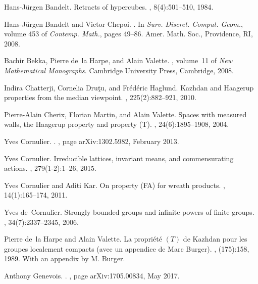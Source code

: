 \documentclass[a4paper]{article}
\theoremstyle{definition}
\begin{document}
\begin{thebibliography}{10}

Hans-J{\"{u}}rgen Bandelt.
\newblock Retracts of hypercubes.
, 8(4):501--510, 1984.

Hans-J{\"{u}}rgen Bandelt and Victor Chepoi.
.
\newblock In {\em Surv. Discret. Comput. Geom.}, volume 453 of {\em Contemp.
  Math.}, pages 49--86. Amer. Math. Soc., Providence, RI, 2008.

Bachir Bekka, Pierre de~la Harpe, and Alain Valette.
, volume~11 of {\em New Mathematical
  Monographs}.
\newblock Cambridge University Press, Cambridge, 2008.

Indira Chatterji, Cornelia Dru\c{t}u, and Fr\'{e}d\'{e}ric Haglund.
\newblock Kazhdan and {H}aagerup properties from the median viewpoint.
, 225(2):882--921, 2010.

Pierre-Alain Cherix, Florian Martin, and Alain Valette.
\newblock Spaces with measured walls, the {H}aagerup property and property
  ({T}).
, 24(6):1895--1908, 2004.

Yves {Cornulier}.
.
, page arXiv:1302.5982, February 2013.

Yves Cornulier.
\newblock Irreducible lattices, invariant means, and commensurating actions.
, 279(1-2):1--26, 2015.

Yves Cornulier and Aditi Kar.
\newblock On property ({FA}) for wreath products.
, 14(1):165--174, 2011.

Yves de~Cornulier.
\newblock Strongly bounded groups and infinite powers of finite groups.
, 34(7):2337--2345, 2006.

Pierre de~la Harpe and Alain Valette.
\newblock La propri\'{e}t\'{e} {$(T)$} de {K}azhdan pour les groupes localement
  compacts (avec un appendice de {M}arc {B}urger).
, (175):158, 1989.
\newblock With an appendix by M. Burger.

Anthony {Genevois}.
.
, page arXiv:1705.00834, May 2017.


\end{thebibliography}
\end{document}
